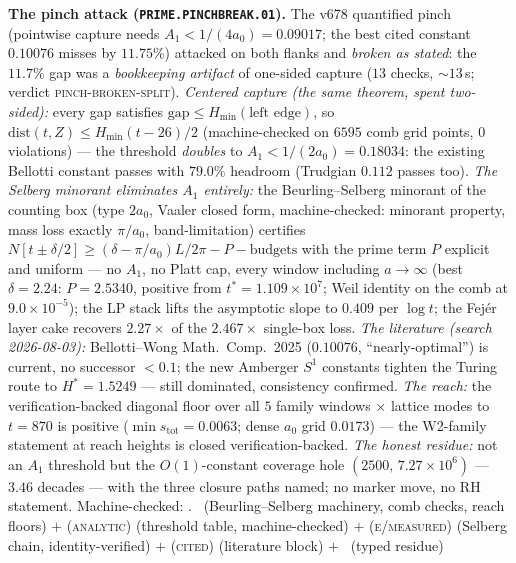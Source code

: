 \documentclass[11pt,a4paper]{article}
\theoremstyle{definition}
\begin{document}
\par\smallskip\noindent\textbf{The pinch attack
(\texttt{PRIME.PINCHBREAK.01}).}
The v678 quantified pinch (pointwise capture needs
$A_1<1/(4a_0)=0.09017$; the best cited constant $0.10076$ misses by
$11.75\%$) attacked on both flanks and \emph{broken as stated}: the
$11.7\%$ gap was a \emph{bookkeeping artifact} of one-sided capture
($13$ checks, ${\sim}13$\,s; verdict \textsc{pinch-broken-split}).
\emph{Centered capture (the same theorem, spent two-sided):} every
gap satisfies $\mathrm{gap}\le H_{\min}(\text{left edge})$, so
$\mathrm{dist}(t,Z)\le H_{\min}(t-26)/2$ (machine-checked on $6595$
comb grid points, $0$ violations) --- the threshold \emph{doubles} to
$A_1<1/(2a_0)=0.18034$: the existing Bellotti constant passes with
$79.0\%$ headroom (Trudgian $0.112$ passes too).  \emph{The Selberg
minorant eliminates $A_1$ entirely:} the Beurling--Selberg minorant
of the counting box (type $2a_0$, Vaaler closed form,
machine-checked: minorant property, mass loss exactly $\pi/a_0$,
band-limitation) certifies $N[t\pm\delta/2]\ge(\delta-\pi/a_0)L/2\pi
-P-\text{budgets}$ with the prime term $P$ explicit and uniform ---
no $A_1$, no Platt cap, every window including $a\to\infty$ (best
$\delta=2.24$: $P=2.5340$, positive from $t^*=1.109\times10^{7}$;
Weil identity on the comb at $9.0\times10^{-5}$); the LP stack lifts
the asymptotic slope to $0.409$ per $\log t$; the Fej\'er layer cake
recovers $2.27\times$ of the $2.467\times$ single-box loss.
\emph{The literature (search 2026-08-03):} Bellotti--Wong Math.\
Comp.\ 2025 ($0.10076$, ``nearly-optimal'') is current, no successor
$<0.1$; the new Amberger $S^1$ constants tighten the Turing route to
$H^*=1.5249$ --- still dominated, consistency confirmed.  \emph{The
reach:} the verification-backed diagonal floor over all $5$ family
windows $\times$ lattice modes to $t=870$ is positive ($\min
s_{\mathrm{tot}}=0.0063$; dense $a_0$ grid $0.0173$) --- the
W2-family statement at reach heights is closed verification-backed.
\emph{The honest residue:} not an $A_1$ threshold but the
$O(1)$-constant coverage hole $(2500,\,7.27\times10^{6})$ ---
$3.46$ decades --- with the three closure paths named; no marker
move, no RH statement.
Machine-checked: .
\mE\ (Beurling--Selberg machinery, comb checks, reach floors) $+$
(\textsc{analytic}) (threshold table, machine-checked) $+$
(\textsc{e/measured}) (Selberg chain, identity-verified) $+$
(\textsc{cited}) (literature block) $+$ \mC\ (typed residue)
\par\smallskip
\end{document}
